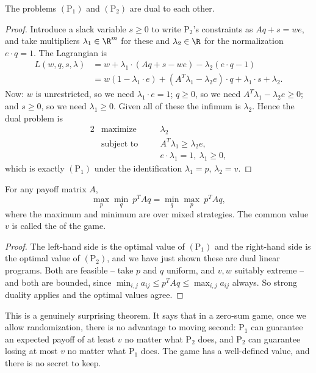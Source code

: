 \begin{theorem}
    The problems $(\mathrm{P}_1)$ and $(\mathrm{P}_2)$ are dual to each other.
\end{theorem}
\begin{proof}
    Introduce a slack variable $s \geq 0$ to write $\mathrm{P}_2$'s constraints as $Aq + s = we$, and take multipliers $\lambda_1 \in \R^m$ for these and $\lambda_2 \in \R$ for the normalization $e\cdot q = 1$. The Lagrangian is
    \begin{align*}
        L(w, q, s, \lambda) &= w + \lambda_1\cdot(Aq + s - we) - \lambda_2(e\cdot q - 1)\\
        &= w\left(1 - \lambda_1\cdot e\right) + \left(A^T\lambda_1 - \lambda_2 e\right)\cdot q + \lambda_1\cdot s + \lambda_2.
    \end{align*}
    Now: $w$ is unrestricted, so we need $\lambda_1\cdot e = 1$; $q \geq 0$, so we need $A^T\lambda_1 - \lambda_2 e \geq 0$; and $s \geq 0$, so we need $\lambda_1 \geq 0$. Given all of these the infimum is $\lambda_2$. Hence the dual problem is
    \begin{alignat*}{2}
        & \text{maximize} \quad && \lambda_2 \\
        & \text{subject to} \quad && A^T\lambda_1 \geq \lambda_2 e,\\
        & && e\cdot\lambda_1 = 1,\ \lambda_1 \geq 0,
    \end{alignat*}
    which is exactly $(\mathrm{P}_1)$ under the identification $\lambda_1 = p$, $\lambda_2 = v$.
\end{proof}

\begin{theorem}
    For any payoff matrix $A$,
    $$
    \max_{p}\min_{q}\ p^TAq = \min_{q}\max_{p}\ p^TAq,
    $$
    where the maximum and minimum are over mixed strategies. The common value $v$ is called the  of the game.
\end{theorem}
\begin{proof}
    The left-hand side is the optimal value of $(\mathrm{P}_1)$ and the right-hand side is the optimal value of $(\mathrm{P}_2)$, and we have just shown these are dual linear programs. Both are feasible -- take $p$ and $q$ uniform, and $v, w$ suitably extreme -- and both are bounded, since $\min_{i,j}a_{ij} \leq p^TAq \leq \max_{i,j}a_{ij}$ always. So strong duality applies and the optimal values agree.
\end{proof}

This is a genuinely surprising theorem. It says that in a zero-sum game, once we allow randomization, there is no advantage to moving second: $\mathrm{P}_1$ can guarantee an expected payoff of at least $v$ no matter what $\mathrm{P}_2$ does, and $\mathrm{P}_2$ can guarantee losing at most $v$ no matter what $\mathrm{P}_1$ does. The game has a well-defined value, and there is no secret to keep.

